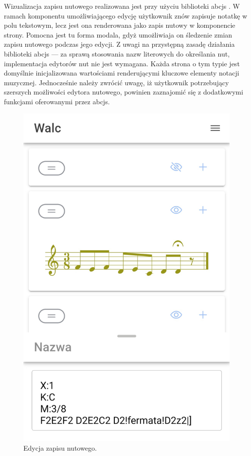 Wizualizacja zapisu nutowego realizowana jest przy użyciu biblioteki abcjs \cite{abcjs}. W ramach komponentu umożliwiającego edycję
użytkownik znów zapisuje notatkę w polu tekstowym, lecz jest ona renderowana jako zapis nutowy w komponencie strony.
Pomocna jest tu forma modala,
gdyż umożliwiaja on śledzenie zmian zapisu nutowego podczas jego edycji. Z uwagi na przystępną zasadę działania biblioteki
abcjs — za sprawą stosowania nazw literowych do określania nut, implementacja edytorów nut nie jest wymagana.
Każda strona o tym typie jest domyślnie inicjalizowana wartościami renderującymi kluczowe elementy notacji muzycznej.
Jednocześnie należy zwrócić uwagę, iż użytkownik potrzebujący szerszych możliwości edytora nutowego, powinien zaznajomić
się z dodatkowymi funkcjami oferowanymi przez abcjs.

\begin{figure}[H]
	\begin{center}
		\includegraphics[scale=0.12]{media/ScoreEditor.jpg}
	\end{center}
	\caption{Edycja zapisu nutowego.}
	\label{rys:score-editor}
\end{figure}

